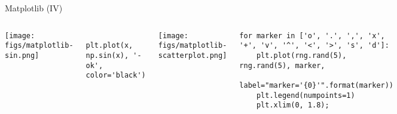 \documentclass[10pt,compress]{beamer} %
\begin{document}
\begin{frame}[fragile]{Matplotlib (IV)}
	\begin{columns}
	\texttt{[image: figs/matplotlib-sin.png]}\\

	\begin{exampleblock}{}
	\vspace{-0.2cm} 
	\begin{lstlisting}
	plt.plot(x, np.sin(x), '-ok', color='black')
	\end{lstlisting}
	\vspace{-0.2cm} 
	\end{exampleblock}

	\centering \texttt{[image: figs/matplotlib-scatterplot.png]}\\
	\begin{exampleblock}{}
	\vspace{-0.2cm} 
\begin{lstlisting}[basicstyle=\tiny]
for marker in ['o', '.', ',', 'x', '+', 'v', '^', '<', '>', 's', 'd']:
	plt.plot(rng.rand(5), rng.rand(5), marker,
			label="marker='{0}'".format(marker))
	plt.legend(numpoints=1)
	plt.xlim(0, 1.8);
\end{lstlisting}
	\vspace{-0.2cm} 
	\end{exampleblock}
	\end{columns}
\end{frame}
\end{document}
